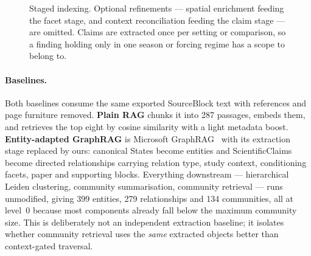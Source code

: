 \documentclass{article}
\begin{document}
\begin{figure}[t]
\centering
{}
\caption{Staged indexing. Optional refinements --- spatial enrichment feeding the facet
stage, and context reconciliation feeding the claim stage --- are omitted. Claims are
extracted once per setting or comparison, so a finding holding only in one season or
forcing regime has a scope to belong to.}
\label{fig:pipeline}
\end{figure}

\paragraph{Baselines.}
Both baselines consume the same exported SourceBlock text with references and page
furniture removed. \textbf{Plain RAG} chunks it into 287 passages, embeds them, and
retrieves the top eight by cosine similarity with a light metadata boost.
\textbf{Entity-adapted GraphRAG} is Microsoft GraphRAG~\citep{edge2024graphrag} with
its extraction stage replaced by ours: canonical States become entities and
ScientificClaims become directed relationships carrying relation type, study context,
conditioning facets, paper and supporting blocks. Everything downstream --- hierarchical
Leiden clustering, community summarisation, community retrieval --- runs unmodified,
giving 399 entities, 279 relationships and 134 communities, all at level~0 because most
components already fall below the maximum community size. This is deliberately not an
independent extraction baseline; it isolates whether community retrieval uses the
\emph{same} extracted objects better than context-gated traversal.
\end{document}
